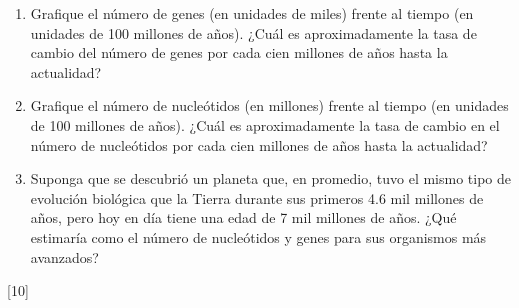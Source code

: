 \documentclass[a4paper]{article}
\newcounter{problema}
\begin{document}
\begin{problema}
\begin{enumerate}
	\item Grafique el número de genes (en unidades de miles) frente al tiempo (en unidades de 100 millones de años). 
	¿Cuál es aproximadamente la tasa de cambio del número de genes por cada cien millones de años hasta la actualidad?
	\item Grafique el número de nucleótidos (en millones) frente al tiempo (en unidades de 100 millones de años). 
	¿Cuál es aproximadamente la tasa de cambio en el número de nucleótidos por cada cien millones de años hasta la actualidad?
	\item Suponga que se descubrió un planeta que, en promedio, tuvo el mismo tipo de evolución biológica que la Tierra durante sus primeros 4.6 mil millones de años, 
	pero hoy en día tiene una edad de 7 mil millones de años. ¿Qué estimaría como el número de nucleótidos y genes para sus organismos más avanzados?
\end{enumerate}
\end{problema}
[10] \cite{NASA_AstrobiologyMath}


\end{document}
